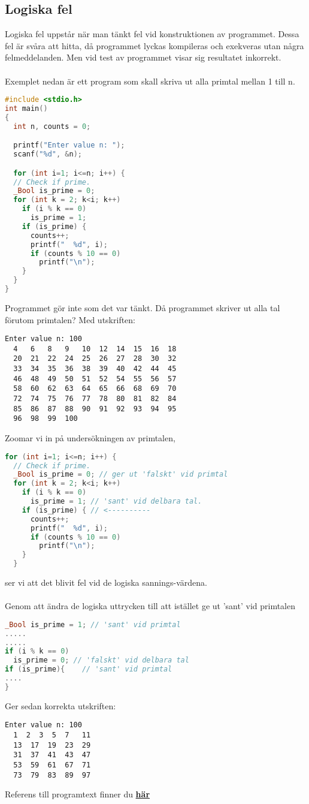 \documentclass[../main.tex]{subfiles}
\begin{document}
\subsection{Logiska fel}
\label{sec:c2}
Logiska fel uppstår när man tänkt fel vid konstruktionen av programmet. Dessa fel är svåra att hitta, då programmet lyckas kompileras och exekveras utan några felmeddelanden.
Men vid test av programmet visar sig resultatet inkorrekt.\\
\\
Exemplet nedan är ett program som skall skriva ut alla primtal mellan 1 till n.
\begin{lstlisting}[language=c]
#include <stdio.h>
int main() 
{
  int n, counts = 0;

  printf("Enter value n: ");
  scanf("%d", &n);

  for (int i=1; i<=n; i++) {
  // Check if prime.
  _Bool is_prime = 0;
  for (int k = 2; k<i; k++)
    if (i % k == 0)
      is_prime = 1;
    if (is_prime) {
      counts++;
      printf("  %d", i);
      if (counts % 10 == 0)
        printf("\n");
    }
  }
}
\end{lstlisting}
Programmet gör inte som det var tänkt. Då programmet skriver ut alla tal förutom primtalen?
Med utskriften:
\begin{lstlisting}
Enter value n: 100
  4   6   8   9   10  12  14  15  16  18
  20  21  22  24  25  26  27  28  30  32
  33  34  35  36  38  39  40  42  44  45
  46  48  49  50  51  52  54  55  56  57
  58  60  62  63  64  65  66  68  69  70
  72  74  75  76  77  78  80  81  82  84
  85  86  87  88  90  91  92  93  94  95
  96  98  99  100
\end{lstlisting}
\newpage

Zoomar vi in på undersökningen av primtalen, 
\begin{lstlisting}[language=c]
for (int i=1; i<=n; i++) {
  // Check if prime.
  _Bool is_prime = 0; // ger ut 'falskt' vid primtal
  for (int k = 2; k<i; k++)
    if (i % k == 0)
      is_prime = 1; // 'sant' vid delbara tal.
    if (is_prime) { // <----------
      counts++;
      printf("  %d", i);
      if (counts % 10 == 0)
        printf("\n");
    }
  }
\end{lstlisting}
ser vi att det blivit fel vid de logiska sannings-värdena.\\
\\
Genom att ändra de logiska uttrycken till att istället ge ut 'sant' vid primtalen
\begin{lstlisting}[language=c]
_Bool is_prime = 1; // 'sant' vid primtal
.....
.....
if (i % k == 0) 
  is_prime = 0; // 'falskt' vid delbara tal
if (is_prime){    // 'sant' vid primtal
....
}
\end{lstlisting}
Ger sedan korrekta utskriften:
\begin{lstlisting}
Enter value n: 100
  1  2  3  5  7   11  
  13  17  19  23  29
  31  37  41  43  47  
  53  59  61  67  71
  73  79  83  89  97
\end{lstlisting}
\begin{tcolorbox}[colback=green!5!white,colframe=green!75!black]
Referens till programtext finner du \hyperref[sec:logic]{\textbf{här}}
\end{tcolorbox}
\end{document}

